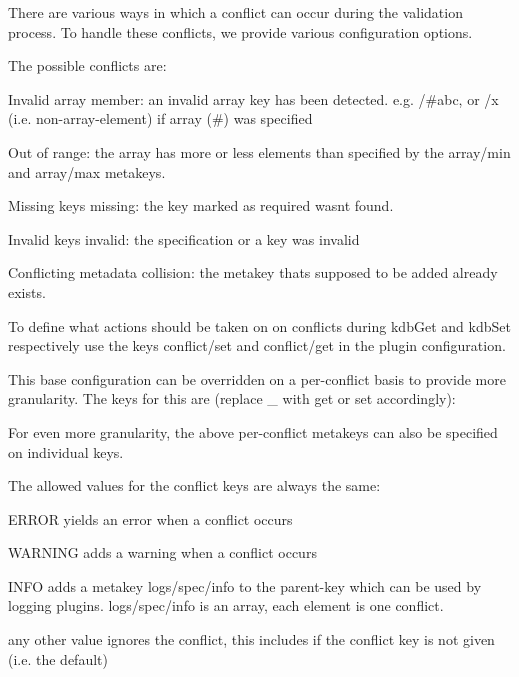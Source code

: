There are various ways in which a conflict can occur during the validation process. To handle these conflicts, we provide various configuration options.

The possible conflicts are\+:


\begin{DoxyItemize}
\item Invalid array {\ttfamily member}\+: an invalid array key has been detected. e.\+g. {\ttfamily /\#abc}, or {\ttfamily /x} (i.\+e. non-\/array-\/element) if array ({\ttfamily \#}) was specified
\item Out of {\ttfamily range}\+: the array has more or less elements than specified by the {\ttfamily array/min} and {\ttfamily array/max} metakeys.
\item Missing keys {\ttfamily missing}\+: the key marked as {\ttfamily require}d wasn\textquotesingle{}t found.
\item Invalid keys {\ttfamily invalid}\+: the specification or a key was invalid
\item Conflicting metadata {\ttfamily collision}\+: the metakey that\textquotesingle{}s supposed to be added already exists.
\end{DoxyItemize}

To define what actions should be taken on on conflicts during {\ttfamily kdb\+Get} and {\ttfamily kdb\+Set} respectively use the keys {\ttfamily conflict/set} and {\ttfamily conflict/get} in the plugin configuration.

This base configuration can be overridden on a per-\/conflict basis to provide more granularity. The keys for this are (replace {\ttfamily \+\_\+} with {\ttfamily get} or {\ttfamily set} accordingly)\+:


\begin{DoxyCode}{0}
\end{DoxyCode}


For even more granularity, the above per-\/conflict metakeys can also be specified on individual keys.

The allowed values for the conflict keys are always the same\+:


\begin{DoxyItemize}
\item {\ttfamily E\+R\+R\+OR} yields an error when a conflict occurs
\item {\ttfamily W\+A\+R\+N\+I\+NG} adds a warning when a conflict occurs
\item {\ttfamily I\+N\+FO} adds a metakey {\ttfamily logs/spec/info} to the parent-\/key which can be used by logging plugins. {\ttfamily logs/spec/info} is an array, each element is one conflict.
\item any other value ignores the conflict, this includes if the conflict key is not given (i.\+e. the default)
\end{DoxyItemize}


